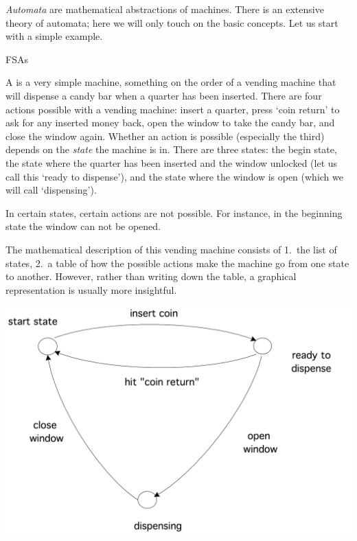 

\emph{Automata} are mathematical abstractions of machines. 
There is an extensive theory of automata; here we will only touch on the basic concepts.
Let us start with a simple example.

 {\acfp{FSA}}

A  is a very simple machine, something on the order of
a vending machine that will dispense a candy bar when a
quarter has been inserted. There are four actions possible with a
vending machine: insert a quarter, press `coin return' to ask for any
inserted money back, open the window to take the candy bar, and close
the window again. Whether an action is possible (especially the third)
depends on the \emph{state} the machine is in. There are three states:
the begin state, the state where the quarter has been inserted and the
window unlocked (let us call this `ready to dispense'), and the state
where the window is open (which we will call `dispensing').

In certain states, certain
actions are not possible. For instance, in the beginning state the
window can not be opened.

The mathematical description of this vending machine consists of
1.~the list of states, 2.~a table of how the possible actions make the
machine go from one state to another. However, rather than writing
down the table, a graphical representation is usually more insightful.


\includegraphics[scale=.15]{graphics/fsa}

